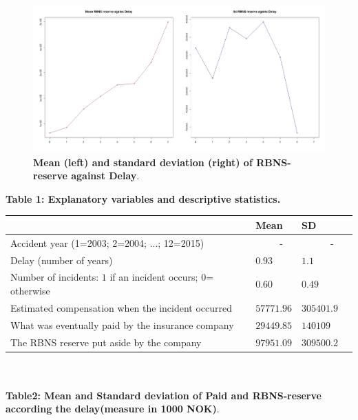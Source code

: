 \documentclass[a4paper]{article}
\begin{document}
\begin{figure}[h]
  \centering
  \includegraphics[scale=0.2]{par_mean_sd_reserve_delay.jpeg}
  \caption{\textbf{Mean (left) and standard deviation (right) of RBNS-reserve against Delay}.}
\end{figure}











 
\textbf{Table 1:   Explanatory variables and descriptive statistics.}
\\


\begin{tabular}{l | p{2.5cm}  p{1.5cm}  p{2cm}}
 ~&Mean &SD\\[.1cm]
\hline \noalign{\smallskip}
Accident year (1=2003; 2=2004; ...; 12=2015) &~~~~~- &~~~~~~-\\[.2cm]
Delay (number of years)&$0.93$    &$ 1.1$\\[.2cm]
Number of incidents: $1$ if an incident occurs; $0$= otherwise &$0.60$ &$    0.49$\\[.2cm]
Estimated compensation when the incident occurred &$57771.96$ &$305401.9$\\[.2cm]
What was eventually paid by the insurance company &$29449.85 $&$140109$\\[.2cm]
The RBNS reserve put aside by the company &$97951.09$ &$309500.2$\\[.1cm] 
\hline  
\end{tabular} \\








 
\textbf{ \\ Table2: Mean and Standard deviation of Paid and RBNS-reserve  according the delay(measure in 1000 NOK)}.\\~\\
\end{document}
